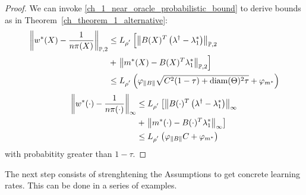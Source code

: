 \begin{proof}
We can invoke 
\eqref{ch_1_near_oracle_probabilistic_bound}
to derive bounds as in 
Theorem~\ref{ch_theorem_1_alternative}:
\begin{align*}
  \left\lVert
    w^*(X)
    -
    \frac{1}{n \pi(X)}
  \right\rVert_{\mathbb{P}, 2}
  &\le
  L_{\rho^{'}}
  \left[ 
    \left\lVert
      B(X)^T 
      \left(
        \lambda^\dagger
        -
        \lambda^*_1
      \right)
    \right\rVert_{\mathbb{P},2}
    \right.
    \\
    &+
    \left. 
    \left\lVert
      m^*(X)
      -
      B(X)^T 
      \lambda^*_1
    \right\rVert_{\mathbb{P},2}
  \right]
  \\
  &\le
  L_{\rho^{'}}
  \left(
    \varphi_{\left\lVert B\right\rVert}
    \sqrt{
      C^2(1 - \tau)
      +
      \text{diam}(\Theta)^2
      \tau
    } 
    +
    \varphi_{m^*}
  \right)
\end{align*}
\begin{align*}
  \left\lVert
    w^*(\cdot)
    -
    \frac{1}{n \pi(\cdot)}
  \right\rVert_{\infty}
  &\le
  L_{\rho^{'}}
  \left[ 
    \left\lVert
      B(\cdot)^T 
      \left(
        \lambda^\dagger
        -
        \lambda^*_1
      \right)
    \right\rVert_{\infty}
    \right.
    \\
    &+
    \left. 
    \left\lVert
      m^*(\cdot)
      -
      B(\cdot)^T 
      \lambda^*_1
    \right\rVert_{\infty}
  \right]
  \\
  &\le
  L_{\rho^{'}}
  \left(
    \varphi_{\left\lVert B\right\rVert}
    C
    +
    \varphi_{m^*}
  \right)
\end{align*}
with probabitity greater than 
$1 - \tau$.
\end{proof}
The next step consists of strenghtening the Assumptions to get concrete learning rates.
This can be done in a series of examples.
